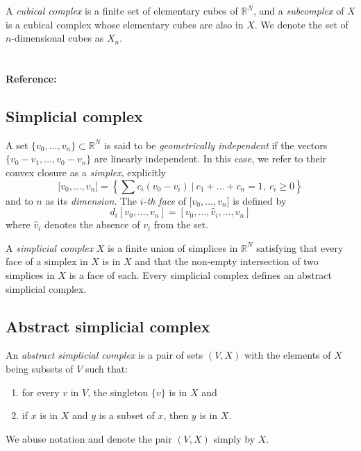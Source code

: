 \documentclass{amsart}
\begin{document}
	A \textit{cubical complex} is a finite set of elementary cubes of $\mathbb{R}^N$, and a \textit{subcomplex} of $X$ is a cubical complex whose elementary cubes are also in $X$. We denote the set of $n$-dimensional cubes as $X_n$.
	
	\paragraph{\\ Reference:} \cite{mischaikow04computational}
	
	\subsection*{Simplicial complex} \label{simplicial_complex}
	
	A set $\{v_0, \dots, v_n\} \subset \mathbb{R}^N$ is said to be \textit{geometrically independent} if the vectors $\{v_0-v_1, \dots, v_0-v_n\}$ are linearly independent. In this case, we refer to their convex closure as a \textit{simplex}, explicitly
	\begin{equation*}
	\lbrack v_0, \dots , v_n \rbrack = \left\{ \sum c_i (v_0 - v_i)\ \big|\ c_1+\dots+c_n = 1,\ c_i \geq 0 \right\}
	\end{equation*}
	and to $n$ as its \textit{dimension}. The $i$\textit{-th face} of $\lbrack v_0, \dots, v_n \rbrack$ is defined by
	\begin{equation*}
	d_i[v_0, \ldots, v_n] = [v_0, \dots, \widehat{v}_i, \dots, v_n]
	\end{equation*}
	where $\widehat{v}_i$ denotes the absence of $v_i$ from the set.
	
	A \textit{simplicial complex} $X$ is a finite union of simplices in $\mathbb{R}^N$ satisfying that every face of a simplex in $X$ is in $X$ and that the non-empty intersection of two simplices in $X$ is a face of each. Every simplicial complex defines an 
	abstract simplicial complex.
	
	\subsection*{Abstract simplicial complex} \label{abstract_simplicial_complex}
	
	An \textit{abstract simplicial complex} is a pair of sets $(V, X)$ with the elements of $X$ being subsets of $V$ such that: 
	\begin{enumerate}
		\item for every $v$ in $V$, the singleton $\{v\}$ is in $X$ and
		\item if $x$ is in $X$ and $y$ is a subset of $x$, then $y$ is in $X$. 
	\end{enumerate}
	We abuse notation and denote the pair $(V, X)$ simply by $X$.
	
\end{document}
